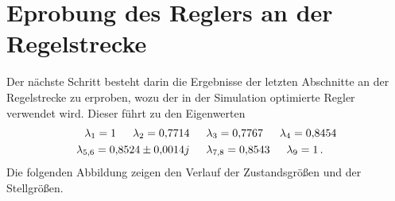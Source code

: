 \section{Eprobung des Reglers an der Regelstrecke}\label{section_corner_balance_test}
Der nächste Schritt besteht darin die Ergebnisse der letzten Abschnitte an der Regelstrecke zu erproben, wozu der in der Simulation optimierte Regler verwendet wird. Dieser führt zu den Eigenwerten
\begin{equation}
\begin{split}
\lambda_{\text{1}} = 1 \hspace{15pt} \lambda_{\text{2}} = 0{,}7714 \hspace{15pt} &\lambda_{\text{3}} = 0{,}7767 \hspace{15pt} \lambda_{\text{4}} = 0{,}8454
\\
\lambda_{\text{5,6}} = 0{,}8524\pm0{,}0014j \hspace{15pt} &\lambda_{\text{7,8}} = 0{,}8543 \hspace{15pt} \lambda_{\text{9}} = 1 \,.
\end{split}
\label{eq_ew1_corner}
\end{equation}
Die folgenden Abbildung zeigen den Verlauf der Zustandsgrößen und der Stellgrößen.
